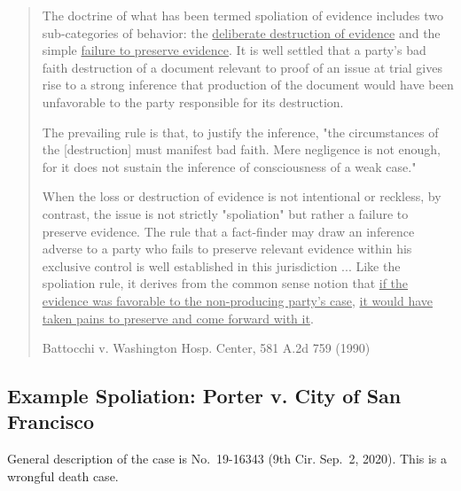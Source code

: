 \documentclass[
  10pt,
  dvipsnames,enabledeprecatedfontcommands]{scrartcl}
\begin{document}
\begin{quote}
The doctrine of what has been termed spoliation of evidence includes two sub-categories of behavior: the \underline{deliberate destruction of evidence} and the simple \underline{failure to preserve evidence}. It is well settled that a party's bad faith destruction of a document relevant to proof of an issue at trial gives rise to a strong inference that production of the document would have been unfavorable to the party responsible for its destruction. 

The prevailing rule is that, to justify the inference, "the circumstances of the [destruction] must manifest bad faith. Mere negligence is not enough, for it does not sustain the inference of consciousness of a weak case." 

When the loss or destruction of evidence is not intentional or reckless, by contrast, the issue is not strictly "spoliation" but rather a failure to preserve evidence. The rule that a fact-finder may draw an inference adverse to a party who fails to preserve relevant evidence within his exclusive control is well established in this jurisdiction ... Like the spoliation rule, it derives from the common sense notion that \underline{if the evidence was favorable to the non-producing party's case}, \underline{it would have taken pains to preserve and come forward with it}.

Battocchi v. Washington Hosp. Center, 581 A.2d 759 (1990)
\end{quote}

\hypertarget{example-spoliation-porter-v.-city-of-san-francisco}{%
\subsection{Example Spoliation: Porter v. City of San
Francisco}\label{example-spoliation-porter-v.-city-of-san-francisco}}

General description of the case is No.~19-16343 (9th Cir. Sep.~2, 2020).
This is a wrongful death case.
\end{document}
